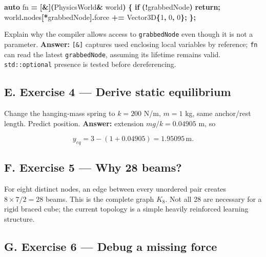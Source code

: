 \documentclass[
  10pt,
  a4paper,
]{article}
\newenvironment{Shaded}{\begin{snugshade}}{\end{snugshade}}
\newcommand{\ControlFlowTok}[1]{\textcolor[rgb]{0.13,0.29,0.53}{\textbf{#1}}}
\newcommand{\DecValTok}[1]{\textcolor[rgb]{0.00,0.00,0.81}{#1}}
\newcommand{\KeywordTok}[1]{\textcolor[rgb]{0.13,0.29,0.53}{\textbf{#1}}}
\newcommand{\NormalTok}[1]{#1}
\newcommand{\OperatorTok}[1]{\textcolor[rgb]{0.81,0.36,0.00}{\textbf{#1}}}
\begin{document}
\begin{Shaded}
\begin{Highlighting}[]
\KeywordTok{auto}\NormalTok{ fn }\OperatorTok{=} \OperatorTok{[\&](}\NormalTok{PhysicsWorld}\OperatorTok{\&}\NormalTok{ world}\OperatorTok{)} \OperatorTok{\{}
    \ControlFlowTok{if} \OperatorTok{(!}\NormalTok{grabbedNode}\OperatorTok{)} \ControlFlowTok{return}\OperatorTok{;}
\NormalTok{    world}\OperatorTok{.}\NormalTok{nodes}\OperatorTok{[*}\NormalTok{grabbedNode}\OperatorTok{].}\NormalTok{force }\OperatorTok{+=}\NormalTok{ Vector3D}\OperatorTok{\{}\DecValTok{1}\OperatorTok{,} \DecValTok{0}\OperatorTok{,} \DecValTok{0}\OperatorTok{\};}
\OperatorTok{\};}
\end{Highlighting}
\end{Shaded}

Explain why the compiler allows access to \texttt{grabbedNode} even
though it is not a parameter. \textbf{Answer:} \texttt{{[}\&{]}}
captures used enclosing local variables by reference; \texttt{fn} can
read the latest \texttt{grabbedNode}, assuming its lifetime remains
valid. \texttt{std::optional} presence is tested before dereferencing.

\subsection{E. Exercise 4 --- Derive static
equilibrium}\label{e.-exercise-4-derive-static-equilibrium}

Change the hanging-mass spring to \(k=200\) N/m, \(m=1\) kg, same
anchor/rest length. Predict position. \textbf{Answer:} extension
\(mg/k=0.04905\) m, so

\[y_{eq}=3-(1+0.04905)=1.95095\,\mathrm m.\]

\subsection{F. Exercise 5 --- Why 28
beams?}\label{f.-exercise-5-why-28-beams}

For eight distinct nodes, an edge between every unordered pair creates
\(8\times7/2=28\) beams. This is the complete graph \(K_8\). Not all 28
are necessary for a rigid braced cube; the current topology is a simple
heavily reinforced learning structure.

\subsection{G. Exercise 6 --- Debug a missing
force}\label{g.-exercise-6-debug-a-missing-force}
\end{document}
